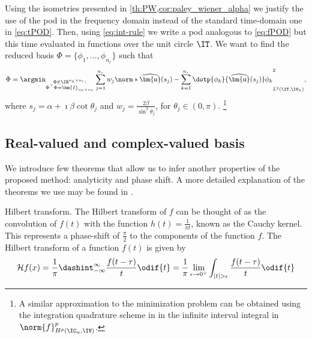 Using the isometries presented in \cref{th:PW,cor:paley_wiener_alpha} we justify the use of the \gls{pod} in the frequency domain instead of the standard time-domain one in \cref{eq:tPOD}.
Then, using \cref{eq:int-rule} we write a \gls{pod} analogous to \cref{eq:fPOD} but this time evaluated in functions over the unit circle $\IT$. We want to find the reduced basis $\Phi = \{\phi_1,\ldots,\phi_{n_r}\}$ such that
\begin{equation} \label{eq:fPOD-circle}
	\Phi = \argmin_{\substack{\Phi \in \IR^{n_h \times n_r}: \\ \Phi^{\top} \Phi = \bm{I}_{n_r \times n_r}}}
    	\sum_{j=1}^{n_s} w_j \norm*{\widehat{\bm{\mathsf{u}}}(s_j) - \sum_{k=1}^{n_r} \dotp{\phi_k}{\widehat{\bm{\mathsf{u}}}(s_j)} \phi_k
	}^2_{L^2(\IT,\IV_h)},
\end{equation}
where $s_j = \alpha + \imath \beta \cot \theta_j$ and $w_j = \frac{2\beta}{\sin^2 \theta_j}$, for $\theta_j \in (0,\pi)$. \footnote{A similar approximation to the minimization problem can be  obtained using the integration quadrature scheme in \cite{boyd_1987} in the infinite interval integral in $\norm{f}^p_{H^p(\IC_\alpha,\IV)}$.}


\subsection{Real-valued and complex-valued basis} \label{ssec:real-basis}
We introduce few theorems that allow us to infer another properties of the proposed method: analyticity and phase shift. A more detailed explanation of the theorems we use may be found in \cite{rudin_real_1987,king_hilbert_2009_1,titchmarsh_introduction_1986}.
\begin{definition}{Hilbert transform.} \label{df:Hilbert}
    The Hilbert transform of $f$ can be thought of as the convolution of $f(t)$ with the function $h(t) = \frac{1}{\pi t}$, known as the Cauchy kernel. This represents a phase-shift of $\frac{\pi}{2}$ to the components of the function $f$. The Hilbert transform of a function  $f(t)$ is given by
    \begin{equation}\label{eq:htrans}
        \mathcal{H} f(x) = \frac{1}{\pi} \dashint_{-\infty}^{\infty} \frac{f(t-\tau)}{t} \odif{t} = \frac{1}{\pi} \lim_{\epsilon \rightarrow 0^+} \int_{|t|> \epsilon} \frac{f(t-\tau)}{t} \odif{t}
    \end{equation}
\end{definition}

